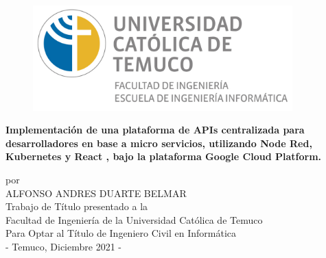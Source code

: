 \thispagestyle{empty}
\begin{titlepage}

\begin{center}

\vspace*{-1in}
\begin{figure}[htb]
  \begin{flushleft}
    \includegraphics[width=10cm]{./figuras/logo_informatica.jpg}
  \end{flushleft}
\end{figure}

{
\vspace*{4cm}
\textbf{ \large{Implementación de una plataforma de APIs centralizada para desarrolladores en base a micro servicios, utilizando Node Red, Kubernetes y React , bajo la plataforma Google Cloud Platform.}} \\
\vspace*{2.0in}
}

\normalsize{por} \\
\vspace*{0.1in}
\normalsize{ALFONSO ANDRES DUARTE BELMAR} \\
\vspace*{1.3in}
\normalsize{Trabajo de Título presentado a la  \\ Facultad de Ingeniería de la Universidad Católica de Temuco  \\ Para Optar al Título de Ingeniero Civil en Informática \\}
\vspace*{0.5in}
\normalsize{- Temuco, Diciembre 2021 -}
\end{center}

\end{titlepage}

